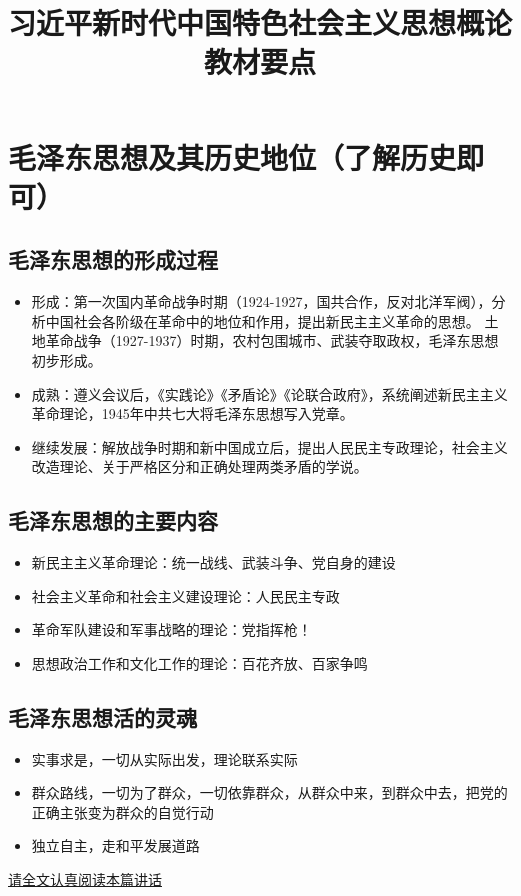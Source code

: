 \documentclass[a4paper, UTF8]{ctexart}
\title{\huge{\heiti 习近平新时代中国特色社会主义思想概论\protect\\教材要点}}
\author{}
\date{}
\begin{document}
\maketitle

\section{毛泽东思想及其历史地位（了解历史即可）}
    \subsection{毛泽东思想的形成过程}
    \begin{itemize}
        \item 形成：第一次国内革命战争时期（1924-1927，国共合作，反对北洋军阀），分析中国社会各阶级在革命中的地位和作用，提出新民主主义革命的思想。
        土地革命战争（1927-1937）时期，农村包围城市、武装夺取政权，毛泽东思想初步形成。
        \item 成熟：遵义会议后，《实践论》《矛盾论》《论联合政府》，系统阐述新民主主义革命理论，1945年中共七大将毛泽东思想写入党章。
        \item 继续发展：解放战争时期和新中国成立后，提出人民民主专政理论，社会主义改造理论、关于严格区分和正确处理两类矛盾的学说。
    \end{itemize}

    \subsection{毛泽东思想的主要内容}
    \begin{itemize}
        \item 新民主主义革命理论：统一战线、武装斗争、党自身的建设
        \item 社会主义革命和社会主义建设理论：人民民主专政
        \item 革命军队建设和军事战略的理论：党指挥枪！
        \item 思想政治工作和文化工作的理论：百花齐放、百家争鸣
    \end{itemize}

    \subsection{毛泽东思想活的灵魂}
    \begin{itemize}
        \item 实事求是，一切从实际出发，理论联系实际
        \item 群众路线，一切为了群众，一切依靠群众，从群众中来，到群众中去，把党的正确主张变为群众的自觉行动
        \item 独立自主，走和平发展道路
    \end{itemize}

    \href{http://www.xinhuanet.com//politics/2013-12/26/c_118723453.htm}{请全文认真阅读本篇讲话}

    
\end{document}
